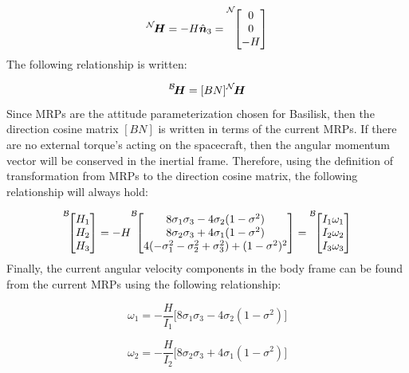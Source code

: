 \begin{equation}
\leftexp{\cal{N}}{\bm H} = -H \hat{\bm n}_3 = \leftexp{\cal{N}}{\begin{bmatrix}
	0\\
	0\\
	-H
	\end{bmatrix}}
\end{equation}
The following relationship is written:

\begin{equation}
\leftexp{\cal{B}}{\bm H} = [BN] \leftexp{\cal{N}}{\bm H}
\end{equation}
Since MRPs are the attitude parameterization chosen for Basilisk, then the direction cosine matrix $[BN]$ is written in terms of the current MRPs. If there are no external torque's acting on the spacecraft, then the angular momentum vector will be conserved in the inertial frame. Therefore, using the definition of transformation from MRPs to the direction cosine matrix\cite{schaub}, the following relationship will always hold:

\begin{equation}
\leftexp{\cal{B}}{\begin{bmatrix}
	H_1\\
	H_2\\
	H_3
	\end{bmatrix}} = -H\leftexp{\cal{B}}{\begin{bmatrix}
	8 \sigma_1 \sigma_3 - 4 \sigma_2 (1 - \sigma^2)\\
	8 \sigma_2 \sigma_3 + 4 \sigma_1 (1 - \sigma^2)\\
	4 (-\sigma_1^2 - \sigma_2^2 + \sigma_3^2) + (1 - \sigma^2)^2
	\end{bmatrix}} = \leftexp{\cal{B}}{\begin{bmatrix}
	I_1 \omega_1\\
	I_2 \omega_2\\
	I_3 \omega_3
	\end{bmatrix}}
\end{equation}
Finally, the current angular velocity components in the body frame can be found from the current MRPs using the following relationship:

\begin{equation}
\omega_1 = -\frac{H}{I_1} \Big[8 \sigma_1 \sigma_3 - 4 \sigma_2 (1 - \sigma^2)\Big]
\end{equation}

\begin{equation}
\omega_2 = -\frac{H}{I_2} \Big[8 \sigma_2 \sigma_3 + 4 \sigma_1 (1 - \sigma^2)\Big]
\end{equation}

